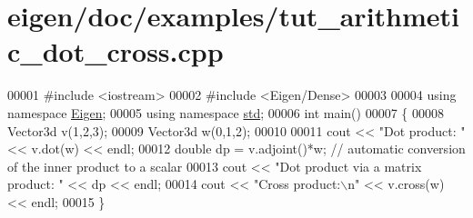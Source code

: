 \hypertarget{eigen_2doc_2examples_2tut__arithmetic__dot__cross_8cpp_source}{}\section{eigen/doc/examples/tut\+\_\+arithmetic\+\_\+dot\+\_\+cross.cpp}
\label{eigen_2doc_2examples_2tut__arithmetic__dot__cross_8cpp_source}

\begin{DoxyCode}
00001 \textcolor{preprocessor}{#include <iostream>}
00002 \textcolor{preprocessor}{#include <Eigen/Dense>}
00003 
00004 \textcolor{keyword}{using namespace }\hyperlink{namespace_eigen}{Eigen};
00005 \textcolor{keyword}{using namespace }\hyperlink{namespacestd}{std};
00006 \textcolor{keywordtype}{int} main()
00007 \{
00008   Vector3d v(1,2,3);
00009   Vector3d w(0,1,2);
00010 
00011   cout << \textcolor{stringliteral}{"Dot product: "} << v.dot(w) << endl;
00012   \textcolor{keywordtype}{double} dp = v.adjoint()*w; \textcolor{comment}{// automatic conversion of the inner product to a scalar}
00013   cout << \textcolor{stringliteral}{"Dot product via a matrix product: "} << dp << endl;
00014   cout << \textcolor{stringliteral}{"Cross product:\(\backslash\)n"} << v.cross(w) << endl;
00015 \}
\end{DoxyCode}
